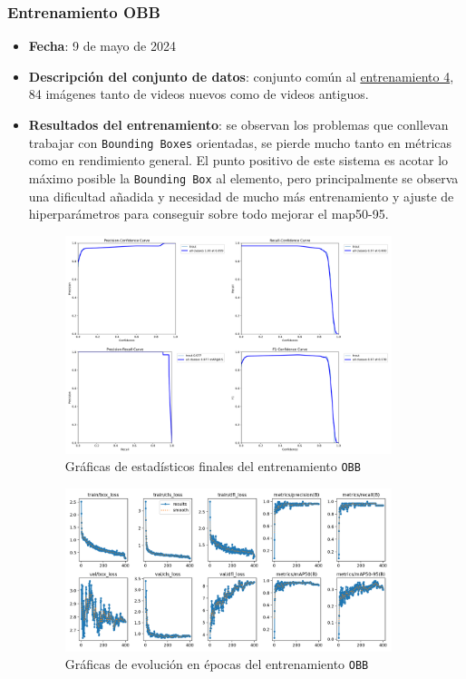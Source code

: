 \subsubsection*{Entrenamiento OBB}
\label{OBB:1}
\begin{itemize}
    \item \textbf{Fecha}: 9 de mayo de 2024
    \item \textbf{Descripción del conjunto de datos}: conjunto común al \hyperref[train:4]{entrenamiento 4}, 84 imágenes tanto de videos nuevos como de videos antiguos.
    \item \textbf{Resultados del entrenamiento}: se observan los problemas que conllevan trabajar con \texttt{Bounding Boxes} orientadas, se pierde mucho tanto en métricas como en rendimiento general. 
    El punto positivo de este sistema es acotar lo máximo posible la \texttt{Bounding Box} al elemento, pero principalmente se observa una dificultad añadida y necesidad de mucho más entrenamiento y 
    ajuste de hiperparámetros para conseguir sobre todo mejorar el \acrshort{map}50-95.

    \begin{figure}[H]
        \centering
        \includegraphics[width=0.9\textwidth]{images/13/b/obb/graficas2.png}
        \caption{Gráficas de estadísticos finales del entrenamiento \texttt{OBB}}
        \label{fig:EstadisticosOBB}
    \end{figure}
    \begin{figure}[H]
        \centering
        \includegraphics[width=0.9\textwidth]{images/13/b/obb/results.png}
        \caption{Gráficas de evolución en épocas del entrenamiento \texttt{OBB}}
        \label{fig:ResultadosOBB}
    \end{figure}

\end{itemize}